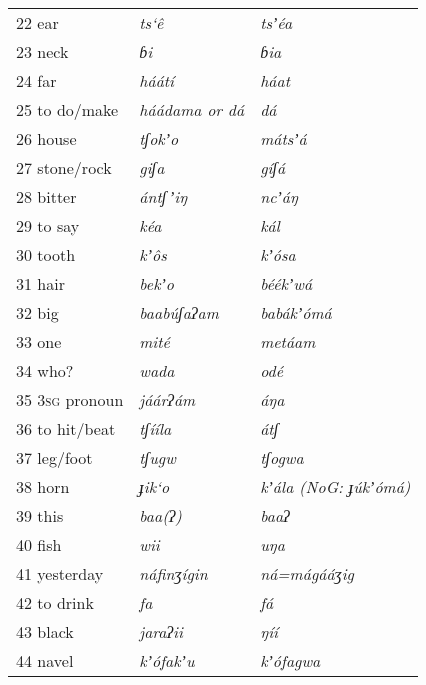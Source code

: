 \documentclass[output=paper]{langsci/langscibook}
\begin{document}
\begin{longtable}{p{}  >{\itshape}p{} >{\itshape}p{}}
22 ear & ts‘\^{e} & tsʼéa \\

23 neck & ɓi & ɓia \\

24 far & háátí & háat \\

25 to do/make & háádama  or     dá & dá \\

26 house & tʃokʼo & mátsʼá \\

27 stone/rock & giʃa & gíʃá \\

28 bitter & ántʃ\,ʼiŋ & ncʼáŋ \\

29 to say & kéa & kál \\

30 tooth & kʼ\^{o}s & kʼ\'{o}sa \\

31 hair & bekʼo & béékʼwá \\

32 big & baab\'{u}ʃaʔam & babákʼ\'{o}má \\

33 one & mité & metáam \\

34 who? & wada & odé \\

35 3\textsc{sg} pronoun & jáárʔám & áŋa \\

36 to hit/beat & tʃííla & átʃ \\

37 leg/foot & tʃugw & tʃogwa \\

38 horn & ɟik‘o & kʼála \textup{(NoG:} ɟ\'{u}kʼ\'{o}má\textup{)} \\

39 this & baa(ʔ) & baaʔ \\

40 fish & wii & uŋa \\

41 yesterday & náfinʒígin & ná=mágááʒig \\

42 to drink & fa & fá \\

43 black & jaraʔii & ŋíí \\

44 navel & kʼ\'{o}fakʼu & kʼ\'{o}fagwa \\


\end{longtable}
\end{document}
